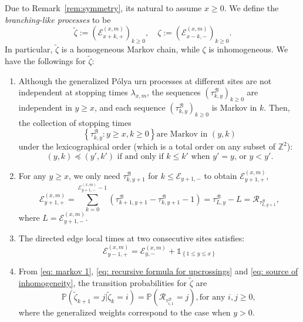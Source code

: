 \documentclass[twoside,12pt, a4paper]{article}
\numberwithin{equation}{section}
\theoremstyle{remark}
\begin{document}
	Due to Remark~\ref{rem:symmetry}, its natural to assume $x \ge 0$. We define the \textit{branching-like processes} to be
	\[
	\tilde{\zeta} := \left(\mathcal{E}^{(x,m)}_{x+k,+} \right)_{k\geq 0}, \quad
	\zeta := \left(\mathcal{E}^{(x,m)}_{x-k,-} \right)_{k\geq 0}
	.\]
	In particular, $\tilde{\zeta}$ is a homogeneous Markov chain, while $\zeta$ is inhomogeneous. We have the followings for 	$\tilde{\zeta}$:
	\begin{enumerate}
		\item Although the generalized P\'{o}lya urn processes at different sites are not independent at stopping times $\lambda_{x,m}$, the sequences $(\tau^{\mathcal{B}}_{k,y})_{k\geq 0} $ are independent in $y \geq x$, and each sequence $\left(\tau^{\mathcal{B}}_{k,y}\right)_{k\geq 0} $ is Markov in $k$. Then, the collection of stopping times
		\begin{equation}\label{eq: markov 1} 
			\left\{\tau^{\mathcal{B}}_{k,y}: y\geq x, k\geq 0 \right\} \mbox{are Markov in $(y,k)$}
		\end{equation}
		under the lexicographical order (which is a total order on any subset of $\mathbb{Z}^2$): 
		\begin{equation*}\label{eq: lexicographical order}
			(y,k) \preceq (y',k')  \mbox{ if and only if }
			k \leq k'   \mbox{ when $y' = y$, or } 
			y <y'. 
		\end{equation*} 
		
		\item For any $y\geq x$, we only need $\tau^{\mathcal{B}}_{k,y+1}$ for $k\leq \mathcal{E}_{y+1,-}$ to obtain $\mathcal{E}^{(x,m)}_{y+1,+}$,
		\begin{equation} \label{eq: recursive formula for upcrossings}
			\mathcal{E}_{y+1,+}^{(x,m)}	=  \sum_{k= 0 }^{\mathcal{E}_{y+1,-}^{(x,m)}-1}	\left(\tau^{\mathcal{B}}_{k+1,y+1}-\tau^{\mathcal{B}}_{k,y+1}-1 \right) = \tau^{\mathcal{B}}_{ L,y } - L = \mathcal{R}_{\tau^{\mathcal{B}}_{ L,y+1 }},
		\end{equation}
		where $L = \mathcal{E}_{y+1,-}^{(x,m)}$.
		
		\item The directed edge local times at two consecutive sites satisfies:
		\begin{equation}\label{eq: source of inhomogeneity}
			\mathcal{E}_{y-1,+}^{(x,m)} = \mathcal{E}_{y,-}^{(x,m)} + \mathbb{1}_{ \left\{ 1\leq y \leq x \right\} }
		\end{equation}
		
		\item  From \eqref{eq: markov 1}, \eqref{eq: recursive formula for upcrossings} and \eqref{eq: source of inhomogeneity}, the transition probabilities for $\tilde{\zeta}$ are 
		\begin{equation}\label{eq: transition prob on positive}
			\mathbb{P}\left(\tilde{\zeta}_{k+1}=j \vert \tilde{\zeta}_k =i  \right) = 
			\mathbb{P}\left( \mathcal{R}_{\tau_{i,1}^{\mathcal{B}}} = j \right), \mbox{for any $i,j\geq 0$, } 
		\end{equation} 
		where the generalized weights correspond to the case when $y>0$.
	\end{enumerate}
	
\end{document}

